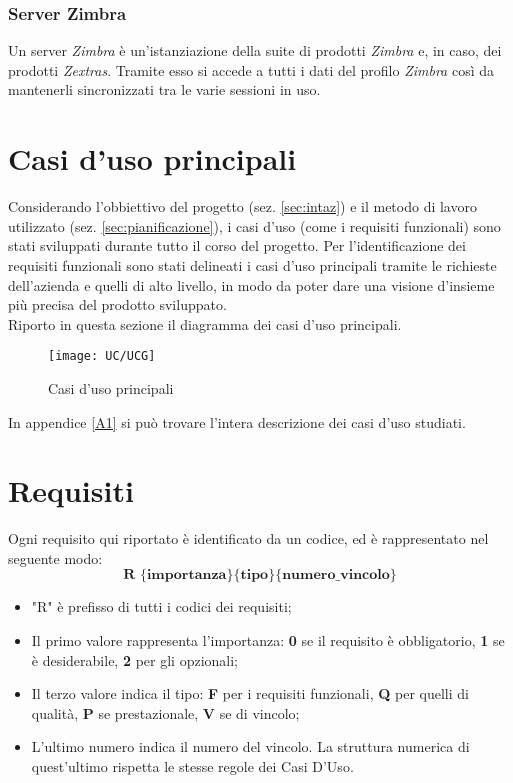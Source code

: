 \subsubsection{Server Zimbra}
Un server \emph{Zimbra} è un'istanziazione della suite di prodotti \emph{Zimbra} e, in caso, 
dei prodotti \emph{Zextras}. Tramite esso si accede a tutti i dati del profilo \emph{Zimbra} 
così da mantenerli sincronizzati tra le varie sessioni in uso.

\section{Casi d'uso principali}
Considerando l'obbiettivo del progetto (sez. \ref{sec:intaz}) e il metodo di 
lavoro utilizzato (sez. \ref{sec:pianificazione}), i casi d'uso (come i requisiti 
funzionali) sono stati sviluppati durante tutto il corso del progetto. 
Per l'identificazione dei requisiti funzionali sono stati delineati  i casi d'uso principali tramite le richieste dell'azienda e quelli  di alto livello, in modo da poter dare una visione d’insieme più precisa del prodotto sviluppato. \\
Riporto in questa sezione il diagramma dei casi d'uso principali. 
\begin{figure}[H] 
	\centering
	\texttt{[image: UC/UCG]}
	\caption{Casi d'uso principali}
\end{figure}
In appendice \ref{A1} si può trovare l'intera descrizione dei casi d'uso studiati.

\section{Requisiti}
Ogni requisito qui riportato è identificato da un codice, ed è rappresentato nel seguente modo:
$$ \textbf{R \{importanza\}\{tipo\}\{numero\_vincolo\} } $$

\begin{itemize}
	\item "R" è prefisso di tutti i codici dei requisiti;
	\item Il primo valore rappresenta l'importanza: \textbf{0} se il requisito è obbligatorio, \textbf{1} se è desiderabile, \textbf{2} per gli opzionali;
	\item Il terzo valore indica il tipo: \textbf{F} per i requisiti funzionali, \textbf{Q} per quelli di qualità, \textbf{P} se prestazionale, \textbf{V} se di vincolo;
	\item L'ultimo numero indica il numero del vincolo. La struttura numerica di quest'ultimo rispetta le stesse regole dei Casi D'Uso.
\end{itemize}


